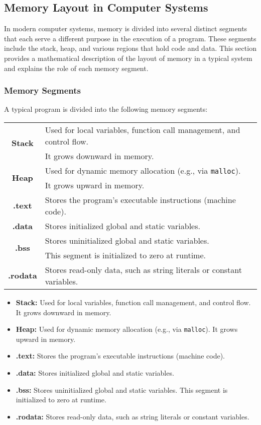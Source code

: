 \subsection{Memory Layout in Computer Systems}

In modern computer systems, memory is divided into several distinct segments that each serve a different purpose in the execution of a program. These segments include the stack, heap, and various regions that hold code and data. This section provides a mathematical description of the layout of memory in a typical system and explains the role of each memory segment.

\subsubsection{Memory Segments}

A typical program is divided into the following memory segments:

\begin{table}[h]
	\centering
	\begin{tabular}{|c|l|}
		\hline
		\multirow{2}{*}{\textbf{Stack}} & Used for local variables, function call management, and control flow. \\
		& It grows downward in memory. \\ \hline
		\multirow{2}{*}{\textbf{Heap}} & Used for dynamic memory allocation (e.g., via \texttt{malloc}). \\ & It grows upward in memory. \\ \hline
		\textbf{.text} & Stores the program's executable instructions (machine code). \\ \hline
		\textbf{.data} & Stores initialized global and static variables. \\ \hline
		\multirow{2}{*}{\textbf{.bss}} & Stores uninitialized global and static variables. \\
		& This segment is initialized to zero at runtime. \\ \hline
		\textbf{.rodata} & Stores read-only data, such as string literals or constant variables. \\ \hline
	\end{tabular}
\end{table}
\begin{itemize}
	\item \textbf{Stack:} Used for local variables, function call management, and control flow. It grows downward in memory.
	\item \textbf{Heap:} Used for dynamic memory allocation (e.g., via \texttt{malloc}). It grows upward in memory.
	\item \textbf{.text:} Stores the program's executable instructions (machine code).
	\item \textbf{.data:} Stores initialized global and static variables.
	\item \textbf{.bss:} Stores uninitialized global and static variables. This segment is initialized to zero at runtime.
	\item \textbf{.rodata:} Stores read-only data, such as string literals or constant variables.
\end{itemize}

